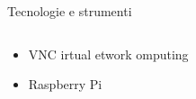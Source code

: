 \documentclass{beamer}
\begin{document}
\begin{frame}[fragile]{Tecnologie e strumenti}

\begin{columns}[T]
\begin{column}{.25\textwidth}
\newline
\begin{itemize}
  \setlength\itemsep{4em}
  \newline
    \item VNC \newline
    irtual\newline
    etwork\newline
    omputing\newline
    \item Raspberry Pi\newline
\end{itemize}


\end{column}
\end{columns}
\end{frame}
\end{document}
